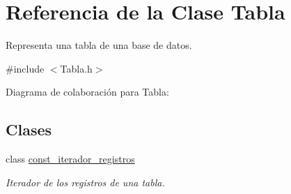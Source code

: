 \hypertarget{classTabla}{\section{Referencia de la Clase Tabla}
\label{classTabla}
}


Representa una tabla de una base de datos.  




{\ttfamily \#include $<$Tabla.\+h$>$}



Diagrama de colaboración para Tabla\+:
\subsection*{Clases}
\begin{DoxyCompactItemize}
\item 
class \hyperlink{classTabla_1_1const__iterador__registros}{const\+\_\+iterador\+\_\+registros}
\begin{DoxyCompactList}\small\item\em Iterador de los registros de una tabla. \end{DoxyCompactList}\end{DoxyCompactItemize}
